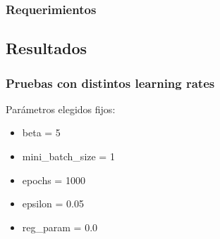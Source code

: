 
\subsubsection{Requerimientos}


\subsection{Resultados}


\subsubsection{Pruebas con distintos learning rates}

Parámetros elegidos fijos:

\begin{itemize}
\item beta = 5
\item mini\_batch\_size = 1
\item epochs = 1000
\item epsilon = 0.05
\item reg\_param = 0.0
\end{itemize}


